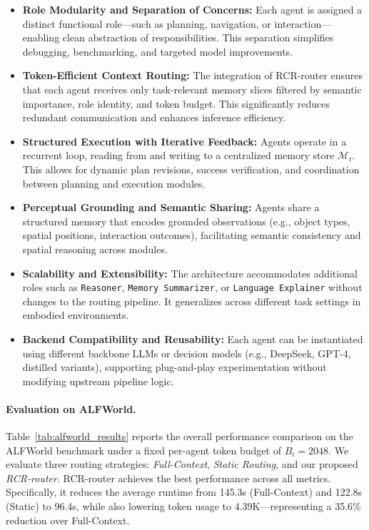 \begin{itemize}
    \item \textbf{Role Modularity and Separation of Concerns:}
    Each agent is assigned a distinct functional role—such as planning, navigation, or interaction—enabling clean abstraction of responsibilities. This separation simplifies debugging, benchmarking, and targeted model improvements.

    \item \textbf{Token-Efficient Context Routing:}
    The integration of RCR-router ensures that each agent receives only task-relevant memory slices filtered by semantic importance, role identity, and token budget. This significantly reduces redundant communication and enhances inference efficiency.

    \item \textbf{Structured Execution with Iterative Feedback:}
    Agents operate in a recurrent loop, reading from and writing to a centralized memory store $\mathcal{M}_t$. This allows for dynamic plan revisions, success verification, and coordination between planning and execution modules.

    \item \textbf{Perceptual Grounding and Semantic Sharing:}
    Agents share a structured memory that encodes grounded observations (e.g., object types, spatial positions, interaction outcomes), facilitating semantic consistency and spatial reasoning across modules.

    \item \textbf{Scalability and Extensibility:}
    The architecture accommodates additional roles such as \texttt{Reasoner}, \texttt{Memory Summarizer}, or \texttt{Language Explainer} without changes to the routing pipeline. It generalizes across different task settings in embodied environments.

    \item \textbf{Backend Compatibility and Reusability:}
    Each agent can be instantiated using different backbone LLMs or decision models (e.g., DeepSeek, GPT-4, distilled variants), supporting plug-and-play experimentation without modifying upstream pipeline logic.
\end{itemize}


\paragraph{Evaluation on ALFWorld.}
Table~\ref{tab:alfworld_results} reports the overall performance comparison on the ALFWorld benchmark under a fixed per-agent token budget of $B_i = 2048$. We evaluate three routing strategies: \textit{Full-Context}, \textit{Static Routing}, and our proposed \textit{RCR-router}. RCR-router achieves the best performance across all metrics. Specifically, it reduces the average runtime from 145.3s (Full-Context) and 122.8s (Static) to 96.4s, while also lowering token usage to 4.39K—representing a 35.6\% reduction over Full-Context. 

